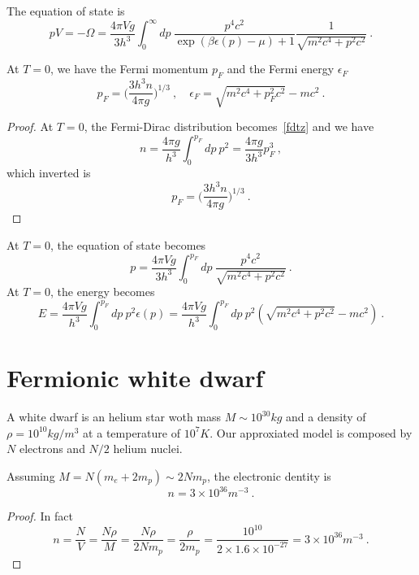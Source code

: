     The equation of state is 
    \begin{equation}
        pV = - \Omega = \frac{4 \pi V g}{3 h^3} \int_0^\infty dp ~ \frac{p^4 c^2}{\exp(\beta \epsilon(p) - \mu) + 1} \frac{1}{\sqrt{m^2 c^4 + p^2 c^2}} ~.
    \end{equation}

    At $T=0$, we have the Fermi momentum $p_F$ and the Fermi energy $\epsilon_F$
    \begin{equation}
        p_F = \Big ( \frac{3 h^3 n}{4 \pi g} \Big)^{1/3} ~, \quad \epsilon_F = \sqrt{m^2 c^4 + p_F^2 c^2} - mc^2 ~.
    \end{equation}
    \begin{proof}
        At $T=0$, the Fermi-Dirac distribution becomes~\eqref{fdtz} and we have
        \begin{equation}
            n = \frac{4 \pi g}{h^3} \int_0^{p_F} dp ~ p^2 = \frac{4 \pi g}{3 h^3} p_F^3 ~,
        \end{equation}
        which inverted is 
        \begin{equation}
            p_F = \Big ( \frac{3 h^3 n}{4 \pi g} \Big)^{1/3} ~.
        \end{equation}
    \end{proof}

    At $T=0$, the equation of state becomes
    \begin{equation}
        p = \frac{4 \pi V g}{3 h^3} \int_0^{p_F} dp ~ \frac{p^4 c^2}{\sqrt{m^2 c^4 + p^2 c^2}}  ~.
    \end{equation}
    At $T=0$, the energy becomes
    \begin{equation}
        E = \frac{4 \pi V g}{h^3} \int_0^{p_F} dp ~ p^2 \epsilon(p) = \frac{4 \pi V g}{h^3} \int_0^{p_F} dp ~ p^2 (\sqrt{m^2 c^4 + p^2 c^2} - mc^2 ) ~.
    \end{equation}

\section{Fermionic white dwarf}

    A white dwarf is an helium star woth mass $M \sim 10^{30} kg$ and a density of $\rho = 10^{10} kg/m^3$ at a temperature of $10^{7} K$. Our approxiated model is composed by $N$ electrons and $N/2$ helium nuclei.

    Assuming $M = N(m_e + 2 m_p) \sim 2 N m_p$, the electronic dentity is 
    \begin{equation*}
        n = 3 \times 10^{36} m^{-3} ~.
    \end{equation*}
    \begin{proof}
        In fact 
        \begin{equation*}
            n = \frac{N}{V} = \frac{N \rho}{M} = \frac{N \rho}{2 N m_p} = \frac{\rho}{2 m_p} = \frac{10^{10}}{2 \times 1.6 \times 10^{-27}} = 3 \times 10^{36} m^{-3} ~.
        \end{equation*}
    \end{proof}

